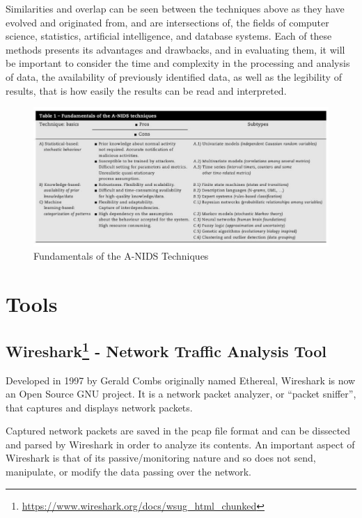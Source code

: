 \documentclass[12pt,]{article}
\begin{document}
Similarities and overlap can be seen between the techniques above as
they have evolved and originated from, and are intersections of, the
fields of computer science, statistics, artificial intelligence, and
database systems. Each of these methods presents its advantages and
drawbacks, and in evaluating them, it will be important to consider the
time and complexity in the processing and analysis of data, the
availability of previously identified data, as well as the legibility of
results, that is how easily the results can be read and interpreted.

\begin{figure}

{\centering \includegraphics{thesis_files/figure-latex/unnamed-chunk-11-1} 

}

\caption{Fundamentals of the A-NIDS Techniques}\label{fig:unnamed-chunk-11}
\end{figure}

\pagebreak

\section{Tools}\label{tools}

\subsection[Wireshark - Network Traffic Analysis
Tool]{Wireshark\footnote{\url{https://www.wireshark.org/docs/wsug_html_chunked}}
- Network Traffic Analysis
Tool}\label{wireshark2---network-traffic-analysis-tool}

Developed in 1997 by Gerald Combs originally named Ethereal, Wireshark
is now an Open Source GNU project. It is a network packet analyzer, or
``packet sniffer'', that captures and displays network packets.

Captured network packets are saved in the pcap file format and can be
dissected and parsed by Wireshark in order to analyze its contents. An
important aspect of Wireshark is that of its passive/monitoring nature
and so does not send, manipulate, or modify the data passing over the
network.
\end{document}
